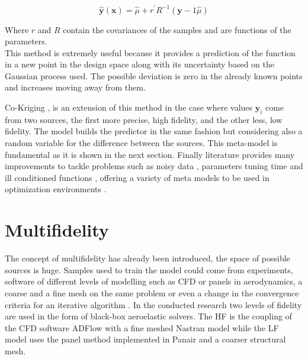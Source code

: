 \documentclass[10pt,twocolumn,a4paper]{scrartcl}
\begin{document}
\begin{equation*}
\mathbf{\hat{y}(x)} = \hat{\mu} + r^{'}R^{-1}(\mathbf{y}-1\hat{\mu})
\end{equation*}

\noindent Where $r$ and $R$ contain the covariances of the samples and are functions of the parameters.
\\This method is extremely useful because it provides a prediction of the function in a new point in the design space along with its uncertainty based on the Gaussian process used. The possible deviation is zero in the already known points and increases moving away from them.%


\noindent Co-Kriging \cite{surrogate}, is an extension of this method in the case where values $\mathbf{y}_i$ come from two sources, the first more precise, high fidelity, and the other less, low fidelity. The model builds the predictor in the same fashion but considering also a random variable for the difference between the sources. This meta-model is fundamental as it is shown in the next section. Finally literature provides many improvements to tackle problems such as noisy data \cite{surrogate}, parameters tuning time and ill conditioned functions \cite{bbf}, offering a variety of meta models to be used in optimization environments \cite{MF} \cite{RBF}. 

\section{Multifidelity}\label{4}
The concept of multifidelity has already been introduced, the space of possible sources is huge. Samples used to train the model could come from experiments, software of different levels of modelling such as CFD or panels in aerodynamics, a coarse and a fine mesh on the same problem or even a change in the convergence criteria for an iterative algorithm \cite{delft}. In the conducted research two levels of fidelity are used in the form of black-box aeroelastic solvers. The HF is the coupling of the CFD software ADFlow with a fine meshed Nastran model while the LF model uses the panel method implemented in Panair and a coarser structural mesh.\\
\end{document}
